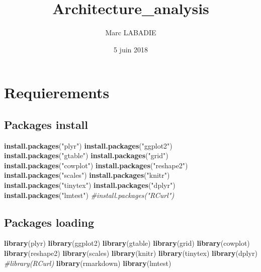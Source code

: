 \documentclass[]{article}
\title{Architecture\_analysis}
\author{Marc LABADIE}
\date{5 juin 2018}
\newenvironment{Shaded}{\begin{snugshade}}{\end{snugshade}}
\newcommand{\KeywordTok}[1]{\textcolor[rgb]{0.13,0.29,0.53}{\textbf{#1}}}
\newcommand{\StringTok}[1]{\textcolor[rgb]{0.31,0.60,0.02}{#1}}
\newcommand{\CommentTok}[1]{\textcolor[rgb]{0.56,0.35,0.01}{\textit{#1}}}
\newcommand{\NormalTok}[1]{#1}
\begin{document}
\maketitle

{
\setcounter{tocdepth}{4}
\tableofcontents
}
\section{Requierements}\label{requierements}

\subsection{Packages install}\label{packages-install}

\begin{Shaded}
\begin{Highlighting}[]
\KeywordTok{install.packages}\NormalTok{(}\StringTok{"plyr"}\NormalTok{)}
\KeywordTok{install.packages}\NormalTok{(}\StringTok{"ggplot2"}\NormalTok{)}
\KeywordTok{install.packages}\NormalTok{(}\StringTok{"gtable"}\NormalTok{)}
\KeywordTok{install.packages}\NormalTok{(}\StringTok{"grid"}\NormalTok{)}
\KeywordTok{install.packages}\NormalTok{(}\StringTok{"cowplot"}\NormalTok{)}
\KeywordTok{install.packages}\NormalTok{(}\StringTok{"reshape2"}\NormalTok{)}
\KeywordTok{install.packages}\NormalTok{(}\StringTok{"scales"}\NormalTok{)}
\KeywordTok{install.packages}\NormalTok{(}\StringTok{"knitr"}\NormalTok{)}
\KeywordTok{install.packages}\NormalTok{(}\StringTok{"tinytex"}\NormalTok{)}
\KeywordTok{install.packages}\NormalTok{(}\StringTok{"dplyr"}\NormalTok{)}
\KeywordTok{install.packages}\NormalTok{(}\StringTok{"lmtest"}\NormalTok{)}
\CommentTok{#install.packages("RCurl")}
\end{Highlighting}
\end{Shaded}

\subsection{Packages loading}\label{packages-loading}

\begin{Shaded}
\begin{Highlighting}[]
\KeywordTok{library}\NormalTok{(plyr)}
\KeywordTok{library}\NormalTok{(ggplot2)}
\KeywordTok{library}\NormalTok{(gtable)}
\KeywordTok{library}\NormalTok{(grid)}
\KeywordTok{library}\NormalTok{(cowplot)}
\KeywordTok{library}\NormalTok{(reshape2)}
\KeywordTok{library}\NormalTok{(scales)}
\KeywordTok{library}\NormalTok{(knitr)}
\KeywordTok{library}\NormalTok{(tinytex)}
\KeywordTok{library}\NormalTok{(dplyr)}
\CommentTok{#library(RCurl)}
\KeywordTok{library}\NormalTok{(rmarkdown)}
\KeywordTok{library}\NormalTok{(lmtest)}
\end{Highlighting}
\end{Shaded}
\end{document}
